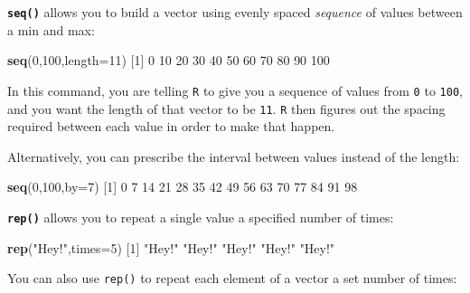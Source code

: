 \documentclass[
]{book}
\newenvironment{Shaded}{\begin{snugshade}}{\end{snugshade}}
\newcommand{\DataTypeTok}[1]{\textcolor[rgb]{0.13,0.29,0.53}{#1}}
\newcommand{\DecValTok}[1]{\textcolor[rgb]{0.00,0.00,0.81}{#1}}
\newcommand{\KeywordTok}[1]{\textcolor[rgb]{0.13,0.29,0.53}{\textbf{#1}}}
\newcommand{\NormalTok}[1]{#1}
\newcommand{\StringTok}[1]{\textcolor[rgb]{0.31,0.60,0.02}{#1}}
\begin{document}
\textbf{\texttt{seq()}} allows you to build a vector using evenly spaced \emph{sequence} of values between a min and max:

\begin{Shaded}
\begin{Highlighting}[]
\KeywordTok{seq}\NormalTok{(}\DecValTok{0}\NormalTok{,}\DecValTok{100}\NormalTok{,}\DataTypeTok{length=}\DecValTok{11}\NormalTok{)}
\NormalTok{ [}\DecValTok{1}\NormalTok{]   }\DecValTok{0}  \DecValTok{10}  \DecValTok{20}  \DecValTok{30}  \DecValTok{40}  \DecValTok{50}  \DecValTok{60}  \DecValTok{70}  \DecValTok{80}  \DecValTok{90} \DecValTok{100}
\end{Highlighting}
\end{Shaded}

In this command, you are telling \texttt{R} to give you a sequence of values from \texttt{0} to \texttt{100}, and you want the length of that vector to be \texttt{11}. \texttt{R} then figures out the spacing required between each value in order to make that happen.

Alternatively, you can prescribe the interval between values instead of the length:

\begin{Shaded}
\begin{Highlighting}[]
\KeywordTok{seq}\NormalTok{(}\DecValTok{0}\NormalTok{,}\DecValTok{100}\NormalTok{,}\DataTypeTok{by=}\DecValTok{7}\NormalTok{)}
\NormalTok{ [}\DecValTok{1}\NormalTok{]  }\DecValTok{0}  \DecValTok{7} \DecValTok{14} \DecValTok{21} \DecValTok{28} \DecValTok{35} \DecValTok{42} \DecValTok{49} \DecValTok{56} \DecValTok{63} \DecValTok{70} \DecValTok{77} \DecValTok{84} \DecValTok{91} \DecValTok{98}
\end{Highlighting}
\end{Shaded}

\textbf{\texttt{rep()}} allows you to repeat a single value a specified number of times:

\begin{Shaded}
\begin{Highlighting}[]
\KeywordTok{rep}\NormalTok{(}\StringTok{"Hey!"}\NormalTok{,}\DataTypeTok{times=}\DecValTok{5}\NormalTok{)}
\NormalTok{[}\DecValTok{1}\NormalTok{] }\StringTok{"Hey!"} \StringTok{"Hey!"} \StringTok{"Hey!"} \StringTok{"Hey!"} \StringTok{"Hey!"}
\end{Highlighting}
\end{Shaded}

You can also use \texttt{rep()} to repeat each element of a vector a set number of times:
\end{document}
